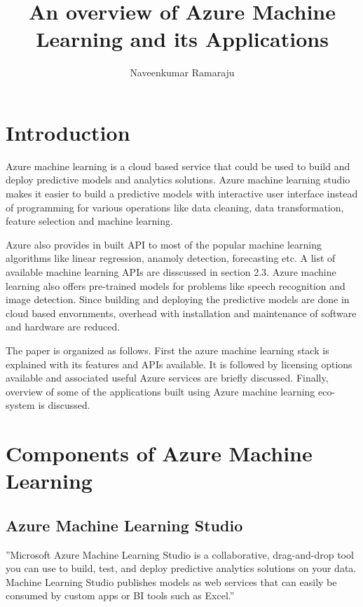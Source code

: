 \documentclass[9pt,twocolumn,twoside]{styles/osajnl}
\title{An overview of Azure Machine Learning and its Applications}
\author[1]{Naveenkumar Ramaraju}
\affil[1]{School of Informatics and Computing, Bloomington, IN 47408, U.S.A.}
\affil[*]{Corresponding authors: nramraj@umail.iu.edu}
\begin{document}
\maketitle

\section{Introduction}

Azure machine learning is a cloud based service that could be used to
build and deploy predictive models and analytics solutions. Azure
machine learning studio makes it easier to build a predictive models
with interactive user interface instead of programming for various
operations like data cleaning, data transformation, feature selection
and machine learning.

Azure also provides in built API to most of the popular machine
learning algorithms like linear regression, anamoly detection,
forecasting etc. A list of available machine learning APIs are
disscussed in section 2.3. Azure machine learning also offers
pre-trained models for problems like speech recognition and image
detection. Since building and deploying the predictive
models are done in cloud based envornments, overhead with installation
and maintenance of software and hardware are reduced.  

The paper is organized as follows. First the azure machine learning
stack is explained with its features and APIs available. It is
followed by licensing options available and associated useful Azure
services are briefly discussed. Finally, overview of some of the
applications built using Azure machine learning eco-system is
discussed.



\section{Components of Azure Machine Learning}

\subsection{Azure Machine Learning Studio}

''Microsoft Azure Machine Learning Studio is a collaborative,
drag-and-drop tool you can use to build, test, and deploy predictive
analytics solutions on your data. Machine Learning Studio publishes
models as web services that can easily be consumed by custom apps or
BI tools such as Excel.'' \cite{www-azureMLStudioSite} 
\end{document}
